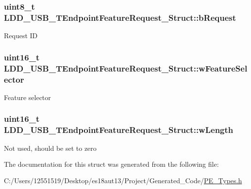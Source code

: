 \subsubsection[{b\+Request}]{\setlength{\rightskip}{0pt plus 5cm}uint8\+\_\+t L\+D\+D\+\_\+\+U\+S\+B\+\_\+\+T\+Endpoint\+Feature\+Request\+\_\+\+Struct\+::b\+Request}\label{struct_l_d_d___u_s_b___t_endpoint_feature_request___struct_acd2dcd4a8762d22f84cfe3b9d9607a25}
Request I\+D \hypertarget{struct_l_d_d___u_s_b___t_endpoint_feature_request___struct_aa026e7ce420430dc65a72dcc10337553}{}
\subsubsection[{w\+Feature\+Selector}]{\setlength{\rightskip}{0pt plus 5cm}uint16\+\_\+t L\+D\+D\+\_\+\+U\+S\+B\+\_\+\+T\+Endpoint\+Feature\+Request\+\_\+\+Struct\+::w\+Feature\+Selector}\label{struct_l_d_d___u_s_b___t_endpoint_feature_request___struct_aa026e7ce420430dc65a72dcc10337553}
Feature selector \hypertarget{struct_l_d_d___u_s_b___t_endpoint_feature_request___struct_aec7dc034039bc4deb5c811afac0686a5}{}
\subsubsection[{w\+Length}]{\setlength{\rightskip}{0pt plus 5cm}uint16\+\_\+t L\+D\+D\+\_\+\+U\+S\+B\+\_\+\+T\+Endpoint\+Feature\+Request\+\_\+\+Struct\+::w\+Length}\label{struct_l_d_d___u_s_b___t_endpoint_feature_request___struct_aec7dc034039bc4deb5c811afac0686a5}
Not used, should be set to zero 

The documentation for this struct was generated from the following file\+:\begin{DoxyCompactItemize}
\item 
C\+:/\+Users/12551519/\+Desktop/es18aut13/\+Project/\+Generated\+\_\+\+Code/\hyperlink{_p_e___types_8h}{P\+E\+\_\+\+Types.\+h}\end{DoxyCompactItemize}
